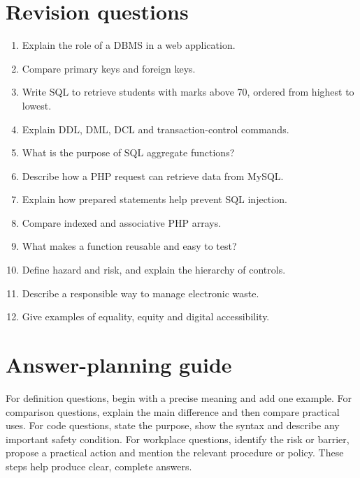 \documentclass[11pt,openany,oneside]{book}
\begin{document}
\section{Revision questions}
\begin{enumerate}
\item Explain the role of a DBMS in a web application.
\item Compare primary keys and foreign keys.
\item Write SQL to retrieve students with marks above 70, ordered from highest to lowest.
\item Explain DDL, DML, DCL and transaction-control commands.
\item What is the purpose of SQL aggregate functions?
\item Describe how a PHP request can retrieve data from MySQL.
\item Explain how prepared statements help prevent SQL injection.
\item Compare indexed and associative PHP arrays.
\item What makes a function reusable and easy to test?
\item Define hazard and risk, and explain the hierarchy of controls.
\item Describe a responsible way to manage electronic waste.
\item Give examples of equality, equity and digital accessibility.
\end{enumerate}

\section{Answer-planning guide}
For definition questions, begin with a precise meaning and add one example. For comparison questions, explain the main difference and then compare practical uses. For code questions, state the purpose, show the syntax and describe any important safety condition. For workplace questions, identify the risk or barrier, propose a practical action and mention the relevant procedure or policy. These steps help produce clear, complete answers.
\end{document}
